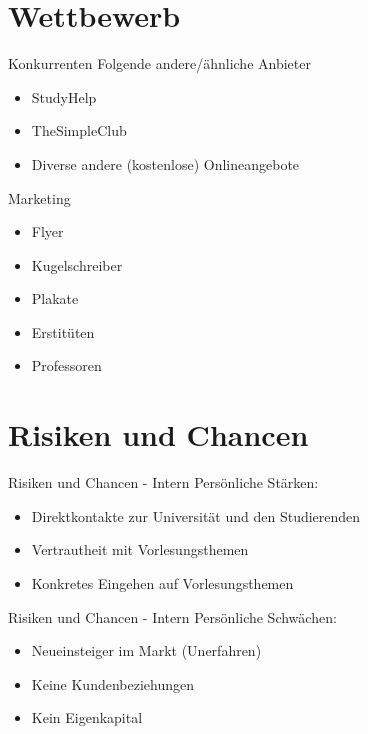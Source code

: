 \section{Wettbewerb}

\begin{frame}[c]{Konkurrenten}
    \Large
    Folgende andere/ähnliche Anbieter
    \pause
    \begin{itemize}[<+->]
    \item StudyHelp
    \item TheSimpleClub
    \item Diverse andere (kostenlose) Onlineangebote
    \end{itemize}
\end{frame}

\begin{frame}[c]{Marketing}
    \Large
    \begin{itemize}[<+(1)->]
        \item Flyer
        \item Kugelschreiber
        \item Plakate
        \item Erstitüten
        \item Professoren
    \end{itemize}
\end{frame}


\section{Risiken und Chancen}

\begin{frame}[c]{Risiken und Chancen - Intern}
    \Large
    Persönliche Stärken:
    \begin{itemize}[<+(1)->]
    \item Direktkontakte zur Universität und den Studierenden
    \item Vertrautheit mit Vorlesungsthemen
    \item Konkretes Eingehen auf Vorlesungsthemen
    \end{itemize}
\end{frame}

\begin{frame}[c]{Risiken und Chancen - Intern}
    \Large
    Persönliche Schwächen:
    \begin{itemize}[<+(1)->]
    \item Neueinsteiger im Markt (Unerfahren)
    \item Keine Kundenbeziehungen
    \item Kein Eigenkapital
    \end{itemize}
\end{frame}

